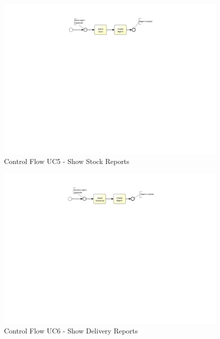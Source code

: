 \begin{figure}[h!]
	\centering
	\includegraphics[width=\textwidth, trim={6cm 16.5cm 7cm 1cm}]{img/UC5Control.pdf}
	\caption{Control Flow UC5 - Show Stock Reports }
	\label{fig:UC5Control}
\end{figure}

\begin{figure}[h!]
	\centering
	\includegraphics[width=\textwidth, trim={6cm 16.5cm 7cm 1cm}]{img/UC6Control.pdf}
	\caption{Control Flow UC6 - Show Delivery Reports }
	\label{fig:UC6Control}
\end{figure}


